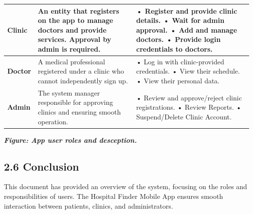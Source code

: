 \documentclass[12pt]{report}
\begin{document}
\begin{longtable}{|p{3cm}|p{6cm}|p{6cm}|}
	\hspace*{0.9cm}\textbf{Clinic}                                                                             &
	An entity that registers on the app to manage doctors and provide services. Approval by admin is required. &
	• Register and provide clinic details.\newline
	• Wait for admin approval.\newline
	• Add and manage doctors.\newline
	• Provide login credentials to doctors.                                                                                                                                                                                               \\
	\hline


	\hspace*{0.85cm}\textbf{Doctor}                                                                            & A medical professional registered under a clinic who cannot independently sign up.  &
	• Log in with clinic-provided credentials.\newline
	• View their schedule.\newline
	• View their personal data.                                                                                                                                                                                                           \\
	\hline

	\hspace*{0.85cm}\textbf{Admin}                                                                             & The system manager responsible for approving clinics and ensuring smooth operation. &
	• Review and approve/reject clinic registrations.\newline
	• Review Reports.\newline
	• Suspend/Delete Clinic Account.                                                                                                                                                                                                      \\
	\hline
\end{longtable}
\begin{center}
	\textit{\textbf{Figure: App user roles and desception.}}
\end{center}


\subsection*{2.6 Conclusion}
This document has provided an overview of the system, focusing on the roles and responsibilities of users. The Hospital Finder Mobile App ensures smooth interaction between patients, clinics, and administrators.
\vspace{0.5cm}
\end{document}
